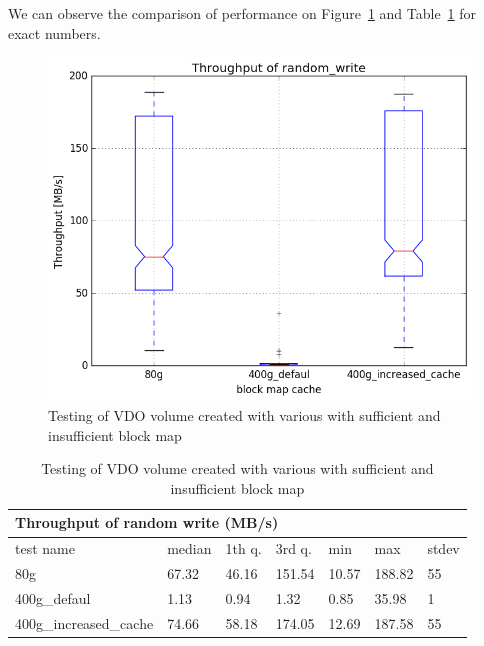 \documentclass[
  color, %
  table, %
  lof,   %
  lot,   %
]{fithesis3}
\begin{document}
We can observe the comparison of performance on Figure~\ref{fig:blockmap-boxplots} and Table~\ref{tab:blockmap-tab} for exact numbers.

\begin{figure}[!htb]
        \centering
        \includegraphics[width=\textwidth]{../results/block_map_cache/report/random_write1_compare_boxplots}
\caption[Block map cache size testing]{Testing of VDO volume created with various with sufficient and insufficient block map}
\label{fig:blockmap-boxplots}
\end{figure}

\begin{table}[!htb]
\centering
\begin{tabular}{|l|l|l|l|l|l|l|}
        \hline
        \multicolumn{7}{|l|}{Throughput of random write (MB/s)} \\ \hline
        test name & median & 1th q. & 3rd q. & min & max & stdev \\ \hline 
80g & 67.32 & 46.16 & 151.54 & 10.57 & 188.82 & 55 \\ \hline
400g\_defaul & 1.13 & 0.94 & 1.32 & 0.85 & 35.98 & 1 \\ \hline
400g\_increased\_cache & 74.66 & 58.18 & 174.05 & 12.69 & 187.58 & 55 \\ \hline
\end{tabular}
\caption{Testing of VDO volume created with various with sufficient and insufficient block map}
\label{tab:blockmap-tab}
\end{table}


\clearpage
\end{document}
